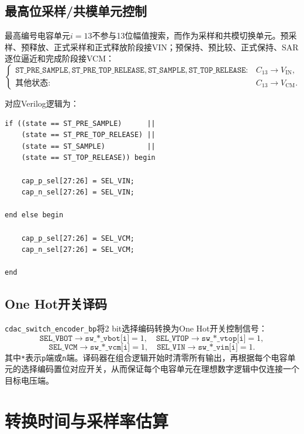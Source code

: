 \subsection{最高位采样/共模单元控制}

最高编号电容单元$i=13$不参与13位幅值搜索，而作为采样和共模切换单元。预采样、预释放、正式采样和正式释放阶段接VIN；预保持、预比较、正式保持、SAR逐位逼近和完成阶段接VCM：
\begin{equation}
\begin{cases}
\texttt{ST\_PRE\_SAMPLE},\texttt{ST\_PRE\_TOP\_RELEASE},
\texttt{ST\_SAMPLE},\texttt{ST\_TOP\_RELEASE}: 
& C_{13}\rightarrow V_{\mathrm{IN}},\\
\text{其他状态}: 
& C_{13}\rightarrow V_{\mathrm{CM}}.
\end{cases}
\end{equation}

对应Verilog逻辑为：
\begin{lstlisting}[style=verilogstyle]
if ((state == ST_PRE_SAMPLE)      ||
    (state == ST_PRE_TOP_RELEASE) ||
    (state == ST_SAMPLE)          ||
    (state == ST_TOP_RELEASE)) begin

    cap_p_sel[27:26] = SEL_VIN;
    cap_n_sel[27:26] = SEL_VIN;

end else begin

    cap_p_sel[27:26] = SEL_VCM;
    cap_n_sel[27:26] = SEL_VCM;

end
\end{lstlisting}

\subsection{One Hot开关译码}

\texttt{cdac\_switch\_encoder\_bp}将2 bit选择编码转换为One Hot开关控制信号：
\begin{equation}
    \texttt{SEL\_VBOT} \rightarrow \texttt{sw\_*\_vbot[i]}=1,\quad
    \texttt{SEL\_VTOP} \rightarrow \texttt{sw\_*\_vtop[i]}=1,
\end{equation}
\begin{equation}
    \texttt{SEL\_VCM} \rightarrow \texttt{sw\_*\_vcm[i]}=1,\quad
    \texttt{SEL\_VIN} \rightarrow \texttt{sw\_*\_vin[i]}=1.
\end{equation}
其中\texttt{*}表示\texttt{p}端或\texttt{n}端。译码器在组合逻辑开始时清零所有输出，再根据每个电容单元的选择编码置位对应开关，从而保证每个电容单元在理想数字逻辑中仅连接一个目标电压端。

\section{转换时间与采样率估算}


